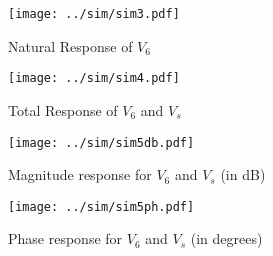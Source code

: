 \begin{figure}[h] \centering
\texttt{[image: ../sim/sim3.pdf]}
\caption{Natural Response of $V_{6}$} 
\label{fig:sim3}
\end{figure}

\begin{figure}[h] \centering
\texttt{[image: ../sim/sim4.pdf]}
\caption{Total Response of $V_{6}$ and $V_{s}$}
\label{fig:sim4}
\end{figure}


\begin{figure}[h] \centering
\texttt{[image: ../sim/sim5db.pdf]}
\caption{Magnitude response for $V_{6}$ and $V_{s}$ (in dB)} 
\label{fig:sim5db}
\end{figure}

\begin{figure}[h] \centering
\texttt{[image: ../sim/sim5ph.pdf]}
\caption{Phase response for $V_{6}$ and $V_{s}$ (in degrees)} 
\label{fig:sim5ph}
\end{figure}




